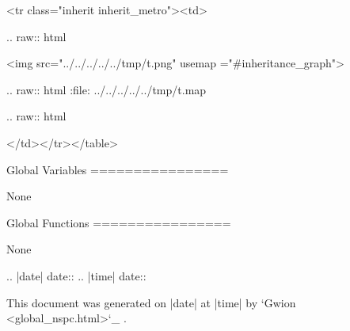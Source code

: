    <tr class="inherit inherit_metro"><td>


  .. raw:: html

   <img src="../../../../../tmp/t.png" usemap ="#inheritance_graph">


  .. raw:: html
   :file:   ../../../../../tmp/t.map


  .. raw:: html

   </td></tr></table>

Global Variables
================

	None

Global Functions
================


	None




.. |date| date::
.. |time| date:: %

This document was generated on |date| at |time| by `Gwion <global_nspc.html>`_ .

